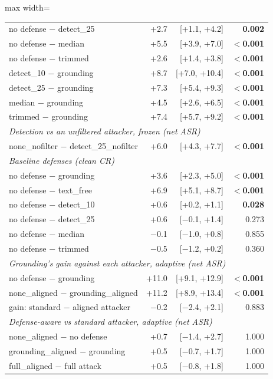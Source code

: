 \begin{table}[t]
\begin{adjustbox}{max width=\linewidth}
\begin{tabular}{lrrr}
no defense $-$ detect\_25 & +2.7 & [+1.1, +4.2] & \textbf{0.002} \\
no defense $-$ median & +5.5 & [+3.9, +7.0] & \textbf{$<$0.001} \\
no defense $-$ trimmed & +2.6 & [+1.4, +3.8] & \textbf{$<$0.001} \\
detect\_10 $-$ grounding & +8.7 & [+7.0, +10.4] & \textbf{$<$0.001} \\
detect\_25 $-$ grounding & +7.3 & [+5.4, +9.3] & \textbf{$<$0.001} \\
median $-$ grounding & +4.5 & [+2.6, +6.5] & \textbf{$<$0.001} \\
trimmed $-$ grounding & +7.4 & [+5.7, +9.2] & \textbf{$<$0.001} \\
\midrule
\multicolumn{4}{l}{\textit{Detection vs an unfiltered attacker, frozen (net ASR)}} \\
none\_nofilter $-$ detect\_25\_nofilter & +6.0 & [+4.3, +7.7] & \textbf{$<$0.001} \\
\midrule
\multicolumn{4}{l}{\textit{Baseline defenses (clean CR)}} \\
no defense $-$ grounding & +3.6 & [+2.3, +5.0] & \textbf{$<$0.001} \\
no defense $-$ text\_free & +6.9 & [+5.1, +8.7] & \textbf{$<$0.001} \\
no defense $-$ detect\_10 & +0.6 & [+0.2, +1.1] & \textbf{0.028} \\
no defense $-$ detect\_25 & +0.6 & [$-$0.1, +1.4] & 0.273 \\
no defense $-$ median & $-$0.1 & [$-$1.0, +0.8] & 0.855 \\
no defense $-$ trimmed & $-$0.5 & [$-$1.2, +0.2] & 0.360 \\
\midrule
\multicolumn{4}{l}{\textit{Grounding's gain against each attacker, adaptive (net ASR)}} \\
no defense $-$ grounding & +11.0 & [+9.1, +12.9] & \textbf{$<$0.001} \\
none\_aligned $-$ grounding\_aligned & +11.2 & [+8.9, +13.4] & \textbf{$<$0.001} \\
gain: standard $-$ aligned attacker & $-$0.2 & [$-$2.4, +2.1] & 0.883 \\
\midrule
\multicolumn{4}{l}{\textit{Defense-aware vs standard attacker, adaptive (net ASR)}} \\
none\_aligned $-$ no defense & +0.7 & [$-$1.4, +2.7] & 1.000 \\
grounding\_aligned $-$ grounding & +0.5 & [$-$0.7, +1.7] & 1.000 \\
full\_aligned $-$ full attack & +0.5 & [$-$0.8, +1.8] & 1.000 \\

\end{tabular}
\end{adjustbox}
\end{table}
